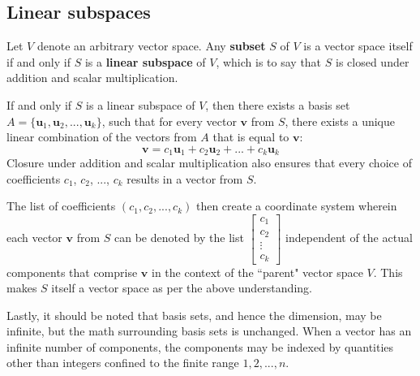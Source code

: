 \documentclass{article}
\begin{document}
\subsection*{Linear subspaces}

Let \(V\) denote an arbitrary vector space. Any {\bf subset} \(S\) of \(V\) is a vector space itself if and only if \(S\) is a {\bf linear subspace} of \(V\), which is to say that \(S\) is closed under addition and scalar multiplication. 

If and only if \(S\) is a linear subspace of \(V\), then there exists a basis set \(A = \{\mathbf{u}_1, \mathbf{u}_2, ..., \mathbf{u}_k\}\), such that for every vector \(\mathbf{v}\) from \(S\), there exists a unique linear combination of the vectors from \(A\) that is equal to \(\mathbf{v}\):
\[\mathbf{v} = c_1\mathbf{u}_1 + c_2\mathbf{u}_2 + ... + c_k\mathbf{u}_k\]
Closure under addition and scalar multiplication also ensures that every choice of coefficients \(c_1\), \(c_2\), ..., \(c_k\) results in a vector from \(S\).

The list of coefficients \((c_1, c_2, ..., c_k)\) then create a coordinate system wherein each vector \(\mathbf{v}\) from \(S\) can be denoted by the list \(\begin{bmatrix} c_1 \\ c_2 \\ \vdots \\ c_k \end{bmatrix}\) independent of the actual components that comprise \(\mathbf{v}\) in the context of the ``parent" vector space \(V\). This makes \(S\) itself a vector space as per the above understanding. 

Lastly, it should be noted that basis sets, and hence the dimension, may be infinite, but the math surrounding basis sets is unchanged. When a vector has an infinite number of components, the components may be indexed by quantities other than integers confined to the finite range \(1, 2, ..., n\).
\end{document}
